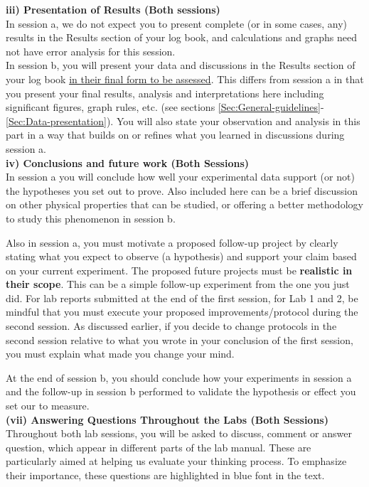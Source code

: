 \documentclass[12pt]{report}
\begin{document}
\noindent \textbf{iii) Presentation of Results (Both sessions)}\\
  In session a, we do not expect you to present complete (or in some cases, any) results in the Results section of your log book, and  calculations and graphs need not have error analysis for this session. \\

In session b, you will present your data and discussions in the Results section of your log book \underline{in their final form to be assessed}. This differs from session a in that you present your final results, analysis and interpretations here including significant figures, graph rules, etc. (see sections \ref{Sec:General-guidelines}-\ref{Sec:Data-presentation}). 
You will also state your observation and analysis in this part in a way that builds on or refines what you learned in discussions during session a.   \\


\noindent \textbf{iv) Conclusions and future work (Both Sessions)  }\\
In session a you will conclude how well your experimental data support (or not) the hypotheses you set out to prove. Also included here can be a brief discussion on other physical properties that can be studied, or offering a better methodology to study this phenomenon in session b.

Also in session a, you must motivate a proposed follow-up project by clearly stating what you expect to observe (a hypothesis) and support your claim based on your current experiment. The proposed future projects must be \textbf{realistic in their scope}.
This can be a simple follow-up experiment from the one you just did. 
For lab reports submitted at the end of the first session, for Lab 1 and 2, be mindful that you must execute your proposed improvements/protocol during the second session. As discussed earlier, if you decide to change protocols in the second session relative to what you wrote in your conclusion of the first session, you must explain what made you change your mind. 

At the end of session b, you should conclude how your experiments in session a and the follow-up in session b performed to validate the hypothesis or effect you set our to measure.\\

\noindent \textbf{(vii) Answering Questions Throughout the Labs (Both Sessions)  }\\
Throughout both  lab sessions, you will be asked to discuss, comment or answer question, which appear in different parts of the lab manual. These are particularly aimed at helping us evaluate your thinking process. {\color{blue} To emphasize their importance, these questions are highlighted in blue font in the text. }\\
\end{document}

